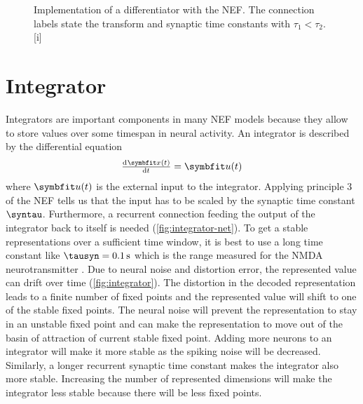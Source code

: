 \begin{figure}
    \begin{captionbeside}{Implementation of a differentiator with the NEF\@. The connection labels state the transform and synaptic time constants with $\tau_1 < \tau_2$.\label{fig:differentiator-net}}[i]
    \end{captionbeside}
\end{figure}


\section{Integrator}
Integrators are important components in many NEF models because they allow to store values over some timespan in neural activity.
An integrator is described by the differential equation
\begin{equation}
    \od{\vc x(t)}{t} = \vc u(t)
\end{equation}
where $\vc u(t)$ is the external input to the integrator.
Applying principle 3 of the NEF tells us that the input has to be scaled by the synaptic time constant $\syntau$.
Furthermore, a recurrent connection feeding the output of the integrator back to itself is needed (\cref{fig:integrator-net}).
To get a stable representations over a sufficient time window, it is best to use a long time constant like $\tausyn = \SI{0.1}{\second}$ which is the range measured for the NMDA neurotransmitter \parencite{sah1990-1,moreno-bote2005}.
Due to neural noise and distortion error, the represented value can drift over time (\cref{fig:integrator}).
The distortion in the decoded representation leads to a finite number of fixed points and the represented value will shift to one of the stable fixed points.
The neural noise will prevent the representation to stay in an unstable fixed point and can make the representation to move out of the basin of attraction of current stable fixed point.
Adding more neurons to an integrator will make it more stable as the spiking noise will be decreased.
Similarly, a longer recurrent synaptic time constant makes the integrator also more stable.
Increasing the number of represented dimensions will make the integrator less stable because there will be less fixed points.
